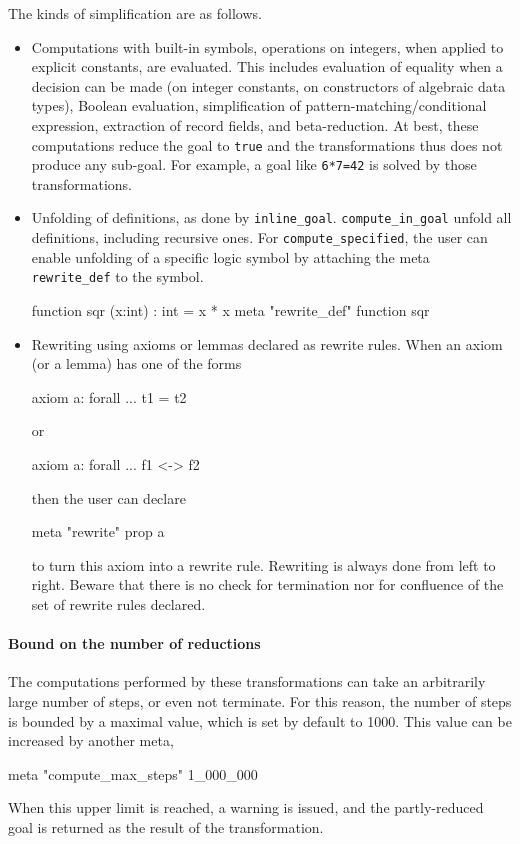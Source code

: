 The kinds of simplification are as follows.
\begin{itemize}
\item Computations with built-in symbols, \eg operations on integers,
  when applied to explicit constants, are evaluated. This includes
  evaluation of equality when a decision can be made (on integer
  constants, on constructors of algebraic data types), Boolean
  evaluation, simplification of pattern-matching/conditional expression,
  extraction of record fields, and beta-reduction.
  At best, these computations reduce the goal to
  \verb|true| and the transformations thus does not produce any sub-goal.
  For example, a goal
  like \verb|6*7=42| is solved by those transformations.
\item Unfolding of definitions, as done by \verb|inline_goal|.
  \verb|compute_in_goal| unfold all definitions, including recursive ones.
  For \verb|compute_specified|, the user can enable unfolding of a specific
  logic symbol by attaching the meta \verb|rewrite_def| to the symbol.
\begin{whycode}
function sqr (x:int) : int = x * x
meta "rewrite_def" function sqr
\end{whycode}
\item Rewriting using axioms or lemmas declared as rewrite rules. When
  an axiom (or a lemma) has one of the forms
\begin{whycode}
axiom a: forall ... t1 = t2
\end{whycode}
  or
\begin{whycode}
axiom a: forall ... f1 <-> f2
\end{whycode}
  then the user can declare
\begin{whycode}
meta "rewrite" prop a
\end{whycode}
  to turn this axiom into a rewrite rule. Rewriting is always done
  from left to right. Beware that there is no check for termination
  nor for confluence of the set of rewrite rules declared.
\end{itemize}

\paragraph{Bound on the number of reductions}
The computations performed by these transformations can take an
arbitrarily large number of steps, or even not terminate. For this
reason, the number of steps is bounded by a maximal value, which is
set by default to 1000. This value can be increased by another meta,
\eg
\begin{whycode}
meta "compute_max_steps" 1_000_000
\end{whycode}
When this upper limit is reached, a warning is issued, and the
partly-reduced goal is returned as the result of the transformation.



